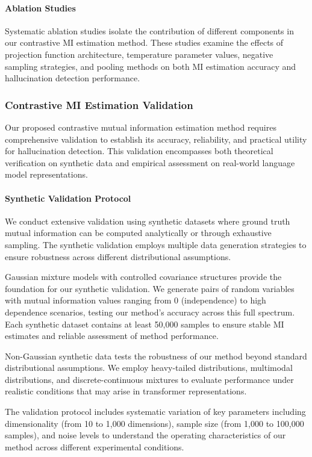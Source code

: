 \paragraph{Ablation Studies}
Systematic ablation studies isolate the contribution of different components in our contrastive MI estimation method. These studies examine the effects of projection function architecture, temperature parameter values, negative sampling strategies, and pooling methods on both MI estimation accuracy and hallucination detection performance.

\subsubsection{Contrastive MI Estimation Validation}

Our proposed contrastive mutual information estimation method requires comprehensive validation to establish its accuracy, reliability, and practical utility for hallucination detection. This validation encompasses both theoretical verification on synthetic data and empirical assessment on real-world language model representations.

\paragraph{Synthetic Validation Protocol}
We conduct extensive validation using synthetic datasets where ground truth mutual information can be computed analytically or through exhaustive sampling. The synthetic validation employs multiple data generation strategies to ensure robustness across different distributional assumptions.

Gaussian mixture models with controlled covariance structures provide the foundation for our synthetic validation. We generate pairs of random variables with mutual information values ranging from 0 (independence) to high dependence scenarios, testing our method's accuracy across this full spectrum. Each synthetic dataset contains at least 50,000 samples to ensure stable MI estimates and reliable assessment of method performance.

Non-Gaussian synthetic data tests the robustness of our method beyond standard distributional assumptions. We employ heavy-tailed distributions, multimodal distributions, and discrete-continuous mixtures to evaluate performance under realistic conditions that may arise in transformer representations.

The validation protocol includes systematic variation of key parameters including dimensionality (from 10 to 1,000 dimensions), sample size (from 1,000 to 100,000 samples), and noise levels to understand the operating characteristics of our method across different experimental conditions.


